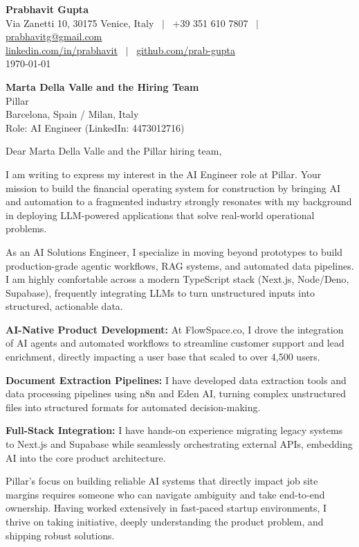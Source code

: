\documentclass[10.5pt,a4paper]{article}
\begin{document}
\textbf{\large Prabhavit Gupta}\\
Via Zanetti 10, 30175 Venice, Italy ~$\vert$~ +39 351 610 7807 ~$\vert$~ \href{mailto:prabhavitg@gmail.com}{prabhavitg@gmail.com}\\
\href{https://www.linkedin.com/in/prabhavit/}{linkedin.com/in/prabhavit} ~$\vert$~ \href{https://github.com/prab-gupta}{github.com/prab-gupta}\\
\today

\textbf{Marta Della Valle and the Hiring Team}\\
Pillar\\
Barcelona, Spain / Milan, Italy\\
Role: AI Engineer (LinkedIn: 4473012716)

Dear Marta Della Valle and the Pillar hiring team,

I am writing to express my interest in the AI Engineer role at Pillar. Your mission to build the financial operating system for construction by bringing AI and automation to a fragmented industry strongly resonates with my background in deploying LLM-powered applications that solve real-world operational problems.

As an AI Solutions Engineer, I specialize in moving beyond prototypes to build production-grade agentic workflows, RAG systems, and automated data pipelines. I am highly comfortable across a modern TypeScript stack (Next.js, Node/Deno, Supabase), frequently integrating LLMs to turn unstructured inputs into structured, actionable data.

\textbf{AI-Native Product Development:} At FlowSpace.co, I drove the integration of AI agents and automated workflows to streamline customer support and lead enrichment, directly impacting a user base that scaled to over 4,500 users.

\textbf{Document Extraction Pipelines:} I have developed data extraction tools and data processing pipelines using n8n and Eden AI, turning complex unstructured files into structured formats for automated decision-making.

\textbf{Full-Stack Integration:} I have hands-on experience migrating legacy systems to Next.js and Supabase while seamlessly orchestrating external APIs, embedding AI into the core product architecture.

Pillar's focus on building reliable AI systems that directly impact job site margins requires someone who can navigate ambiguity and take end-to-end ownership. Having worked extensively in fast-paced startup environments, I thrive on taking initiative, deeply understanding the product problem, and shipping robust solutions. 
\end{document}
